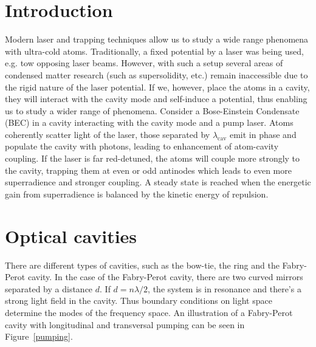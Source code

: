 \section{Introduction}
Modern laser and trapping techniques allow us to study a wide range phenomena with ultra-cold atoms. Traditionally, a fixed potential by a laser was being used, e.g. tow opposing laser beams. However, with such a setup several areas of condensed matter research (such as supersolidity, etc.) remain inaccessible due to the rigid nature of the laser potential. If we, however, place the atoms in a cavity, they will interact with the cavity mode and self-induce a potential, thus enabling us to study a wider range of phenomena. Consider a Bose-Einstein Condensate (BEC) in a cavity interacting with the cavity mode and a pump laser. Atoms coherently scatter light of the laser, those separated by $\lambda_\text{cav}$ emit in phase and populate the cavity with photons, leading to enhancement of atom-cavity coupling. If the laser is far red-detuned, the atoms will couple more strongly to the cavity, trapping them at even or odd antinodes which leads to even more superradience and stronger coupling. A steady state is reached when the energetic gain from superradience is balanced by the kinetic energy of repulsion.


\section{Optical cavities}
There are different types of cavities, such as the bow-tie, the ring and the Fabry-Perot cavity. In the case of the Fabry-Perot cavity, there are two curved mirrors separated by a distance $d$. If $d = n \lambda / 2$, the system is in resonance and there's a strong light field in the cavity. Thus boundary conditions on light space determine the modes of the frequency space. An illustration of a Fabry-Perot cavity with longitudinal and transversal pumping can be seen in Figure~\ref{pumping}.

